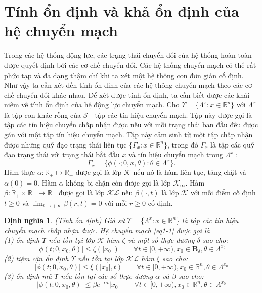 \documentclass[14pt,a4paper,oneside]{report}		%
\newtheorem{define}[theorem]{Định nghĩa}
\begin{document}
\section{Tính ổn định và khả ổn định của hệ chuyển mạch}
Trong các hệ thống động lực, các trạng thái chuyển đổi của hệ thống hoàn toàn được quyết định bởi các cơ chế chuyển đổi. Các hệ thống chuyển mạch có thể rất phức tạp và đa dạng thậm chí khi ta xét một hệ thông con đơn giản cố định. Như vậy ta cần xét đến tính ổn đinh của các hệ thông chuyển mạch theo các cơ chế chuyển đổi khác nhau. Để xét được tính ổn định, ta cần biết được các khái niêm về tính ổn định của hệ động lực chuyển mạch.
Cho $\Upsilon = \{\Lambda^x:x\in\mathbb{R}^n\}$ với $\Lambda^x$ là tập con khác rỗng của $\mathcal{S}$ - tập các tín hiệu chuyển mạch. Tập này được gọi là tập các tín hiệu chuyển chấp nhận được nếu với mỗi trạng thái ban đầu đều được gán với một tập tín hiệu chuyển mạch. Tập này cảm sinh từ một tập chấp nhận được những quỹ đạo trạng thái liên tục $\{\Gamma_x:x\in\mathbb{R}^n\}$, trong đó $\Gamma_x$ là tập các quỹ đạo trạng thái với trạng thái bắt đầu $x$ và tín hiệu chuyển mạch trong $\Lambda^x$ :
$$\Gamma_x = \{\phi(\cdot;0,x,\theta):\theta\in\Lambda^x\}.$$
Hàm thực $\alpha :\mathbb{R}_+ \mapsto \mathbb{R}_+$ được gọi là lớp $\mathcal{K}$ nếu nó là hàm liên tục, tăng chặt và $\alpha(0)=0$. Hàm $\alpha$ không bị chặn còn được gọi là lớp $\mathcal{K}_\infty$. Hàm $\beta : \mathbb{R}_+ \times \mathbb{R}_+ \mapsto \mathbb{R}_+$ được gọi là lớp $\mathcal{KL}$ nếu $\beta(\cdot,t)$ là lớp $\mathcal{K}$ với mỗi điểm cố định $t \geq 0$ và $\lim_{t\rightarrow +\infty}\beta(r,t)=0$ với mỗi $r\geq 0$ cố định.

\begin{define} \label{def1-1} (Tính ổn định) Giả sử $\Upsilon = \{\Lambda^x:x\in\mathbb{R}^n\}$ là tập các tín hiệu chuyển mạch chấp nhận được. Hệ chuyển mạch \ref{eq1-1} được gọi là \\
(1) ổn định $\Upsilon$ nếu tồn tại lớp $\mathcal{K}$ hàm $\zeta$ và một số thực dương $\delta$ sao cho:
$$|\phi(t;0,x_0,\theta)|\leq\zeta(|x_0|)\qquad\forall t \in [0,+\infty ), x_0 \in\mathbf{B}_\delta , \theta \in\Lambda^{x_0}$$
(2) tiệm cận ổn định $\Upsilon$ nếu tồn tại lớp $\mathcal{KL}$ hàm $\xi$ sao cho:
$$|\phi(t;0,x_0,\theta)|\leq\xi(|x_0|,t)\qquad\forall t \in [0,+\infty ), x_0 \in\mathbb{R}^n , \theta \in\Lambda^{x_0}$$
(3) ổn định mũ $\Upsilon$ nếu tồn tại các số thực dương $\alpha$ và $\beta$ sao cho:
$$|\phi(t;0,x_0,\theta)|\leq \beta e^{-\alpha t}|x_0|\qquad\forall t \in [0,+\infty ), x_0 \in\mathbb{R}^n , \theta \in\Lambda^{x_0}$$
\end{define}
\end{document}
